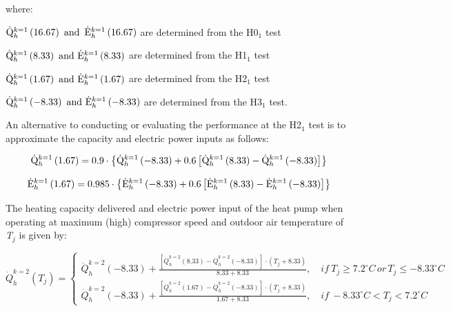 where:

\({\rm{\dot Q}}_h^{k = 1}\left( {{\rm{16}}{\rm{.67}}} \right){\rm{~and~}}\,{\rm{\dot E}}_h^{k = 1}\left( {{\rm{16}}{\rm{.67}}} \right)\) are determined from the H0\(_{1}\) test

\({\rm{\dot Q}}_h^{k = 1}\left( {{\rm{8}}{\rm{.33}}} \right) {\rm{~and~}} {\rm{\dot E}}_h^{k = 1}\left( {{\rm{8}}{\rm{.33}}} \right)\) are determined from the H1\(_{1}\) test

\({\rm{\dot Q}}_h^{k = 1}\left( {{\rm{1}}{\rm{.67}}} \right) {\rm{~and~}} {\rm{\dot E}}_h^{k = 1}\left( {{\rm{1}}{\rm{.67}}} \right)\) are determined from the H2\(_{1}\) test

\({\rm{\dot Q}}_h^{k = 1}\left( {{\rm{ - 8}}{\rm{.33}}} \right) {\rm{~and~}} {\rm{\dot E}}_h^{k = 1}\left( {{\rm{ - 8}}{\rm{.33}}} \right)\) are determined from the H3\(_{1}\) test.

An alternative to conducting or evaluating the performance at the H2\(_{1}\) test is to approximate the capacity and electric power inputs as follows:

\begin{equation}
{\rm{\dot Q}}_h^{k = 1}\left( {{\rm{1}}{\rm{.67}}} \right) = 0.9 \cdot \left\{ {{\rm{\dot Q}}_h^{k = 1}\left( {{\rm{ - 8}}{\rm{.33}}} \right) + 0.6\left[ {{\rm{\dot Q}}_h^{k = 1}\left( {{\rm{8}}{\rm{.33}}} \right) - {\rm{\dot Q}}_h^{k = 1}\left( {{\rm{ - 8}}{\rm{.33}}} \right)} \right]} \right\}
\end{equation}

\begin{equation}
{\rm{\dot E}}_h^{k = 1}\left( {{\rm{1}}{\rm{.67}}} \right) = 0.985 \cdot \left\{ {{\rm{\dot E}}_h^{k = 1}\left( {{\rm{ - 8}}{\rm{.33}}} \right) + 0.6\left[ {{\rm{\dot E}}_h^{k = 1}\left( {{\rm{8}}{\rm{.33}}} \right) - {\rm{\dot E}}_h^{k = 1}\left( {{\rm{ - 8}}{\rm{.33}}} \right)} \right]} \right\}
\end{equation}

The heating capacity delivered and electric power input of the heat pump when operating at maximum (high) compressor speed and outdoor air temperature of \emph{T\(_{j}\)} is given by:

\begin{equation}
\dot Q_h^{k = 2}({T_j}) = \left\{ \begin{array}{l}\dot Q_h^{k = 2}( - 8.33) + \frac{{\left[ {\dot Q_h^{k = 2}(8.33) - \dot Q_h^{k = 2}( - 8.33)} \right] \cdot \left( {{T_j} + 8.33} \right)}}{{8.33 + 8.33}},\quad if~{T_j} \ge 7.2^\circ C\,or\,{T_j} \le  - 8.33^\circ C\\\dot Q_h^{k = 2}( - 8.33) + \frac{{\left[ {\dot Q_h^{k = 2}(1.67) - \dot Q_h^{k = 2}( - 8.33)} \right] \cdot \left( {{T_j} + 8.33} \right)}}{{1.67 + 8.33}},\quad if~ - 8.33^\circ C < {T_j} < 7.2^\circ C\end{array} \right.
\end{equation}

